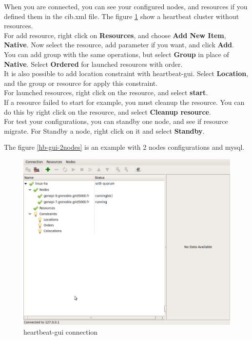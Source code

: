 \documentclass[a4paper,10pt]{report}
\begin{document}
When you are connected, you can see your configured nodes, and resources if you defined them in the cib.xml file. The figure \ref{hb-gui-connect} show a heartbeat cluster without resources.\\

For add resource, right click on \textbf{Resources}, and choose \textbf{Add New Item}, \textbf{Native}. Now select the resource, add parameter if you want, and click \textbf{Add}.\\
You can add group with the same operations, but select \textbf{Group} in place of \textbf{Native}. Select \textbf{Ordered} for launched resources with order.\\

It is also possible to add location constraint with heartbeat-gui. Select \textbf{Location}, and the group or resource for apply this constraint.\\

For launched resources, right click on the resource, and select \textbf{start}.\\

If a resource failed to start for example, you must cleanup the resource. You can do this by right click on the resource, and select \textbf{Cleanup resource}.\\

For test your configurations, you can standby one node, and see if resource migrate. For Standby a node, right click on it and select \textbf{Standby}.

The figure \ref{hb-gui-2nodes} is an example with 2 nodes configurations and mysql.

\begin{figure}[H]
\centering
\includegraphics[scale=0.4]{schema/hb_gui-2nodes-connect.png}
\caption{heartbeat-gui connection} 
\label{hb-gui-connect} 
\end{figure}
\end{document}
